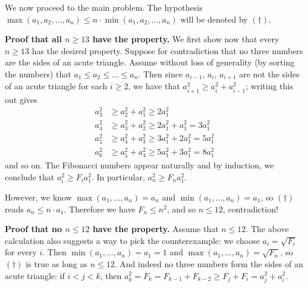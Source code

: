 \documentclass[11pt]{scrartcl}
\begin{document}
We now proceed to the main problem.
The hypothesis $\max(a_1,a_2,\dots,a_n)
\le n \cdot \min(a_1,a_2,\dots,a_n)$
will be denoted by $(\dagger)$.

\medskip

\textbf{Proof that all $n \ge 13$ have the property.}
We first show now that every $n \ge 13$ has the desired property.
Suppose for contradiction that no three numbers are the sides of an acute triangle.
Assume without loss of generality (by sorting the numbers)
that $a_1 \le a_2 \le \dots \le a_n$.
Then since $a_{i-1}$, $a_i$, $a_{i+1}$ are not the sides of an acute triangle
for each $i \ge 2$, we have that $a_{i+1}^2 \ge a_i^2 + a_{i-1}^2$;
writing this out gives
\begin{align*}
  a_3^2 &\ge a_2^2 + a_1^2 \ge 2a_1^2 \\
  a_4^2 &\ge a_3^2 + a_2^2 \ge 2a_1^2 + a_1^2 = 3a_1^2 \\
  a_5^2 &\ge a_4^2 + a_3^2 \ge 3a_1^2 + 2a_1^2 = 5a_1^2 \\
  a_6^2 &\ge a_5^2 + a_4^2 \ge 5a_1^2 + 3a_1^2 = 8a_1^2
\end{align*}
and so on.
The Fibonacci numbers appear naturally and by induction,
we conclude that $a_i^2 \ge F_i a_1^2$.
In particular, $a_n^2 \ge F_n a_1^2$.

However, we know $\max(a_1, \dots, a_n) = a_n$
and $\min(a_1, \dots, a_n) = a_1$,
so $(\dagger)$ reads $a_n \le n \cdot a_1$.
Therefore we have $F_n \le n^2$, and so $n \le 12$, contradiction!

\medskip

\textbf{Proof that no $n \le 12$ have the property.}
Assume that $n \le 12$.
The above calculation also suggests a way to pick the counterexample:
we choose $a_i = \sqrt{F_i}$ for every $i$.
Then $\min(a_1, \dots, a_n) = a_1 = 1$
and $\max(a_1, \dots, a_n) = \sqrt{F_n}$,
so $(\dagger)$ is true as long as $n \le 12$.
And indeed no three numbers form the sides of an acute triangle:
if $i < j < k$,
then $a_k^2 = F_k = F_{k-1} + F_{k-2} \ge F_j + F_i = a_j^2 + a_i^2$.
\pagebreak
\end{document}
